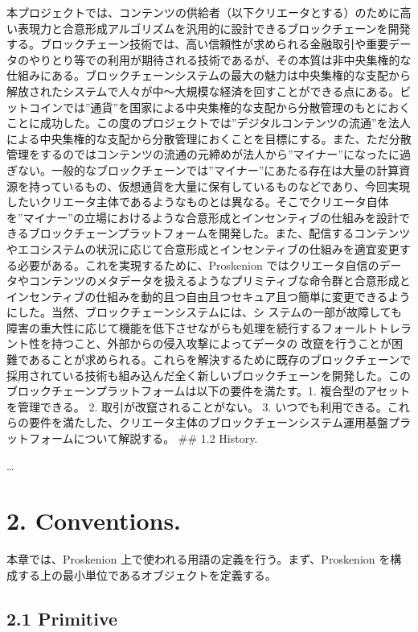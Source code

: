 本プロジェクトでは、コンテンツの供給者（以下クリエータとする）のために高い表現力と合意形成アルゴリズムを汎用的に設計できるブロックチェーンを開発する。ブロックチェーン技術では、高い信頼性が求められる金融取引や重要データのやりとり等での利用が期待される技術であるが、その本質は非中央集権的な仕組みにある。ブロックチェーンシステムの最大の魅力は中央集権的な支配から解放されたシステムで人々が中〜大規模な経済を回すことができる点にある。ビットコインでは''通貨''を国家による中央集権的な支配から分散管理のもとにおくことに成功した。この度のプロジェクトでは''デジタルコンテンツの流通''を法人による中央集権的な支配から分散管理におくことを目標にする。また、ただ分散管理をするのではコンテンツの流通の元締めが法人から''マイナー''になったに過ぎない。一般的なブロックチェーンでは''マイナー''にあたる存在は大量の計算資源を持っているもの、仮想通貨を大量に保有しているものなどであり、今回実現したいクリエータ主体であるようなものとは異なる。そこでクリエータ自体を''マイナー''の立場におけるような合意形成とインセンティブの仕組みを設計できるブロックチェーンプラットフォームを開発した。また、配信するコンテンツやエコシステムの状況に応じて合意形成とインセンティブの仕組みを適宜変更する必要がある。これを実現するために、Proskenion
ではクリエータ自信のデータやコンテンツのメタデータを扱えるようなプリミティブな命令群と合意形成とインセンティブの仕組みを動的且つ自由且つセキュア且つ簡単に変更できるようにした。当然、ブロックチェーンシステムには、シ
ステムの一部が故障しても障害の重大性に応じて機能を低下させながらも処理を続行するフォールトトレラント性を持つこと、外部からの侵入攻撃によってデータの
改竄を行うことが困難であることが求められる。これらを解決するために既存のブロックチェーンで採用されている技術も組み込んだ全く新しいブロックチェーンを開発した。このブロックチェーンプラットフォームは以下の要件を満たす。1.
複合型のアセットを管理できる。 2. 取引が改竄されることがない。 3.
いつでも利用できる。これらの要件を満たした、クリエータ主体のブロックチェーンシステム運用基盤プラットフォームについて解説する。
\#\# 1.2 History.

\ldots{}

\hypertarget{conventions.}{%
\section{2. Conventions.}\label{conventions.}}

本章では、Proskenion 上で使われる用語の定義を行う。まず、Proskenion
を構成する上の最小単位であるオブジェクトを定義する。

\hypertarget{primitive}{%
\subsection{2.1 Primitive}\label{primitive}}

